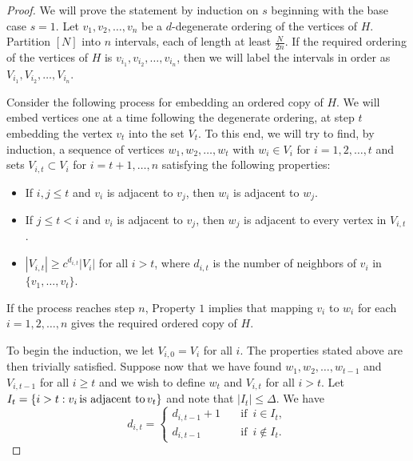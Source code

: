 \documentclass[11pt]{article}
\begin{document}
\begin{proof}
We will prove the statement by induction on $s$ beginning with the base case $s=1$. Let $v_{1}, v_{2}, \dots, v_{n}$ be a $d$-degenerate ordering of the vertices of $H$. Partition $[N]$ into $n$ intervals, each of length at least $\frac{N}{2n}$. If the required ordering of the vertices of $H$ is $v_{i_1}, v_{i_2}, \dots, v_{i_n}$, then we 
will label the intervals in order as $V_{i_1}, V_{i_2}, \dots, V_{i_n}$. 

Consider the following process for embedding an ordered copy of $H$. We will embed vertices one at a time following the degenerate ordering, at step $t$ embedding the vertex $v_t$ into the set $V_t$. To this end, we will try to find, by induction, a sequence of vertices $w_1, w_2, \dots, w_t$ with $w_i \in V_i$ for $i = 1, 2, \dots, t$ and sets
$V_{i, t} \subset V_i$ for $i = t + 1, \dots, n$ satisfying the following properties:

\begin{itemize}

\item[1.] 
If $i, j \leq t$ and $v_i$ is adjacent to $v_j$, then $w_i$ is adjacent to $w_j$.

\item[2.]
If $j \leq t < i$ and $v_i$ is adjacent to $v_j$, then $w_j$ is adjacent to every vertex in $V_{i,t}$.

\item[3.] 
$|V_{i,t}| \ge c^{d_{i,t}} |V_i|$ for all $i > t$, where $d_{i,t}$ is the number of neighbors of $v_i$ in $\{v_1,\dots,v_t\}$.
\end{itemize}
If the process reaches step $n$, Property $1$ implies that mapping $v_i$ to $w_i$ for each $i = 1, 2, \dots, n$ gives the required ordered copy of $H$.

To begin the induction, we let $V_{i, 0} = V_i$ for all $i$. The properties stated above are then trivially satisfied. Suppose now that we have found $w_1, w_2, \dots, w_{t-1}$ and $V_{i,t-1}$ for all $i \geq t$ and we wish to define $w_{t}$ and $V_{i, t}$ for all $i > t$. Let $I_{t}=\{i > t :v_{i}\,\textrm{\textrm{is adjacent to}\,\ensuremath{v_{t}}}\}$
and note that $|I_{t}|\le\Delta$. We have
\[d_{i,t}=\left\{ \begin{split}d_{i,t-1}+1 & \quad \textrm{if }\, i\in I_{t},\\
d_{i,t-1} & \quad\textrm{if }\, i\notin I_{t}.
\end{split}
\right.\]



\end{proof}
\end{document}
